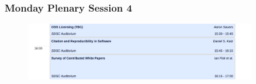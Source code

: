 \begin{frame}
\frametitle{Monday Plenary Session 4}

\begin{figure}[htbp]
\begin{center}
\includegraphics[width=0.9\textwidth]{images/hsf-sdsc-monday4.png}
\end{center}
\end{figure}


\end{frame}


